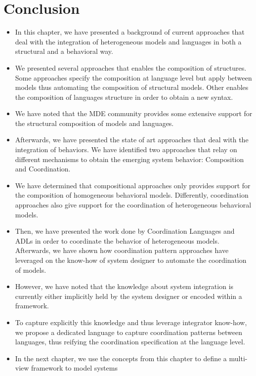\section{Conclusion}
	\begin{itemize}
	\item In this chapter, we have presented a background of current approaches that deal with the integration of heterogeneous models and languages in both a structural and a behavioral way. 
	
	\item We presented several approaches that enables the composition of structures. Some approaches specify the composition at language level but apply between models thus automating the composition of structural models. Other enables the composition of languages structure in order to obtain a new syntax.  
	
	\item We have noted that the MDE community provides some extensive support for the structural composition of models and languages.
	
	\item Afterwards, we have presented the state of art approaches that deal with the integration of behaviors. We have identified two approaches that relay on different mechanisms to obtain the emerging system behavior: Composition and Coordination. 
	
	\item We have determined that compositional approaches only provides support for the composition of homogeneous behavioral models. Differently, coordination approaches also give support for the coordination of heterogeneous behavioral models. 
	
	\item Then, we have presented the work done by Coordination Languages and ADLs in order to coordinate the behavior of heterogeneous models. Afterwards, we have shown how coordination pattern approaches have leveraged on the know-how of system designer to automate the coordination of models. 
	
	\item However, we have noted that the knowledge about system integration is currently either implicitly held by the system designer or encoded within a framework. 
	
	\item To capture explicitly this knowledge and thus leverage integrator know-how, we propose a dedicated language to capture coordination patterns between languages, thus reifying the coordination specification at the language level.    

	\item In the next chapter, we use the concepts from this chapter to define a multi-view framework to model systems
	\end{itemize}


